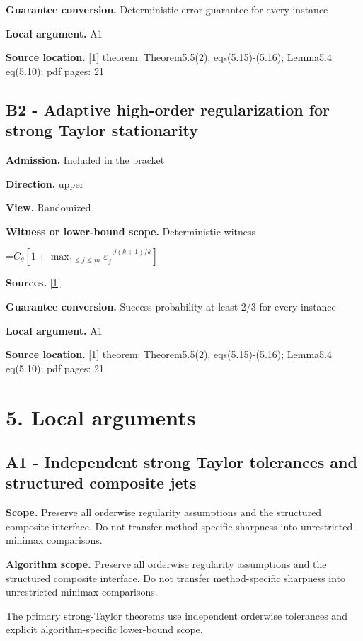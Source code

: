 \documentclass[10pt,a4paper]{article}
\newcommand{\AtlasMath}[1]{\par\begingroup\centering\setbox0=\hbox{$\displaystyle #1$}\ifdim\wd0>1.4\linewidth\typeout{ATLAS WIDE FORMULA: \the\wd0}\fi\ifdim\wd0>\linewidth\resizebox{\linewidth}{!}{\box0}\else\box0\fi\par\endgroup}
\begin{document}
\textbf{Guarantee conversion.} Deterministic-error guarantee for every instance

\textbf{Local argument.} A1

\textbf{Source location.} \href{https://optimization-online.org/wp-content/uploads/2020/01/7590.pdf}{[1]} theorem: Theorem5.5(2), eqs(5.15)-(5.16); Lemma5.4 eq(5.10); pdf pages: 21

\subsection{B2 - Adaptive high-order regularization for strong Taylor stationarity}
\textbf{Admission.} Included in the bracket

\textbf{Direction.} upper

\textbf{View.} Randomized

\textbf{Witness or lower-bound scope.} Deterministic witness

\AtlasMath{C_\theta[1+\max_{1\le j\le m}\varepsilon_j^{-j(k+1)/k}]}
\textbf{Sources.} \href{https://optimization-online.org/wp-content/uploads/2020/01/7590.pdf}{[1]}

\textbf{Guarantee conversion.} Success probability at least 2/3 for every instance

\textbf{Local argument.} A1

\textbf{Source location.} \href{https://optimization-online.org/wp-content/uploads/2020/01/7590.pdf}{[1]} theorem: Theorem5.5(2), eqs(5.15)-(5.16); Lemma5.4 eq(5.10); pdf pages: 21

\section{5. Local arguments}
\subsection{A1 - Independent strong Taylor tolerances and structured composite jets}
\textbf{Scope.} Preserve all orderwise regularity assumptions and the structured composite interface. Do not transfer method-specific sharpness into unrestricted minimax comparisons.

\textbf{Algorithm scope.} Preserve all orderwise regularity assumptions and the structured composite interface. Do not transfer method-specific sharpness into unrestricted minimax comparisons.

The primary strong-Taylor theorems use independent orderwise tolerances and explicit algorithm-specific lower-bound scope.
\end{document}
